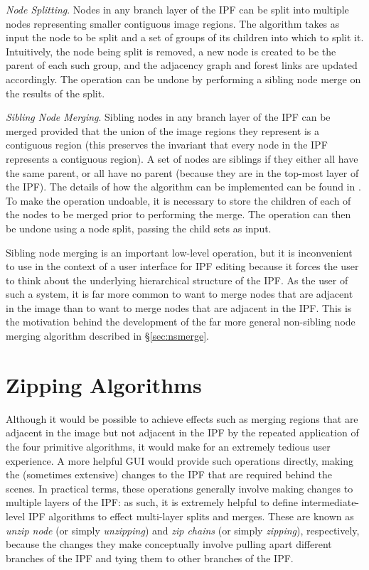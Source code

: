 \documentclass[a4paper]{article}
\begin{document}
\emph{Node Splitting}. Nodes in any branch layer of the IPF can be split into multiple nodes representing smaller contiguous image regions. The algorithm takes as input the node to be split and a set of groups of its children into which to split it. Intuitively, the node being split is removed, a new node is created to be the parent of each such group, and the adjacency graph and forest links are updated accordingly. The operation can be undone by performing a sibling node merge on the results of the split.

\emph{Sibling Node Merging}. Sibling nodes in any branch layer of the IPF can be merged provided that the union of the image regions they represent is a contiguous region (this preserves the invariant that every node in the IPF represents a contiguous region). A set of nodes are siblings if they either all have the same parent, or all have no parent (because they are in the top-most layer of the IPF). The details of how the algorithm can be implemented can be found in \cite{golodetz11}. To make the operation undoable, it is necessary to store the children of each of the nodes to be merged prior to performing the merge. The operation can then be undone using a node split, passing the child sets as input.

Sibling node merging is an important low-level operation, but it is inconvenient to use in the context of a user interface for IPF editing because it forces the user to think about the underlying hierarchical structure of the IPF. As the user of such a system, it is far more common to want to merge nodes that are adjacent in the image than to want to merge nodes that are adjacent in the IPF. This is the motivation behind the development of the far more general non-sibling node merging algorithm described in \S\ref{sec:nsmerge}.

\section{Zipping Algorithms}
\label{sec:zipping}

Although it would be possible to achieve effects such as merging regions that are adjacent in the image but not adjacent in the IPF by the repeated application of the four primitive algorithms, it would make for an extremely tedious user experience. A more helpful GUI would provide such operations directly, making the (sometimes extensive) changes to the IPF that are required behind the scenes. In practical terms, these operations generally involve making changes to multiple layers of the IPF: as such, it is extremely helpful to define intermediate-level IPF algorithms to effect multi-layer splits and merges. These are known as \emph{unzip node} (or simply \emph{unzipping}) and \emph{zip chains} (or simply \emph{zipping}), respectively, because the changes they make conceptually involve pulling apart different branches of the IPF and tying them to other branches of the IPF.
\end{document}
